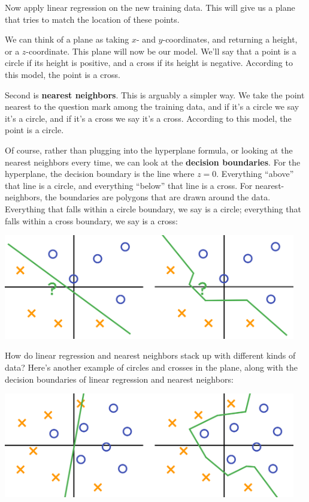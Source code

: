 \documentclass[11pt,paper=letter]{scrartcl}
\begin{document}
Now apply linear regression on the new training data. This will give us a plane that tries to match the location of these points.

We can think of a plane as taking $x$- and $y$-coordinates, and returning a height, or a $z$-coordinate. This plane will now be our model. We'll say that a point is a circle if its height is positive, and a cross if its height is negative. According to this model, the point is a cross.

Second is \textbf{nearest neighbors}. This is arguably a simpler way. We take the point nearest to the question mark among the training data, and if it's a circle we say it's a circle, and if it's a cross we say it's a cross. According to this model, the point is a circle.

Of course, rather than plugging into the hyperplane formula, or looking at the nearest neighbors every time, we can look at the \textbf{decision boundaries}. For the hyperplane, the decision boundary is the line where $z = 0$. Everything ``above'' that line is a circle, and everything ``below'' that line is a cross. For nearest-neighbors, the boundaries are polygons that are drawn around the data. Everything that falls within a circle boundary, we say is a circle; everything that falls within a cross boundary, we say is a cross:

\begin{center}
\includegraphics[height=1.8in]{3.png}
\end{center}

How do linear regression and nearest neighbors stack up with different kinds of data? Here's another example of circles and crosses in the plane, along with the decision boundaries of linear regression and nearest neighbors:

\begin{center}
\includegraphics[height=1.8in]{4.png}
\end{center}
\end{document}
